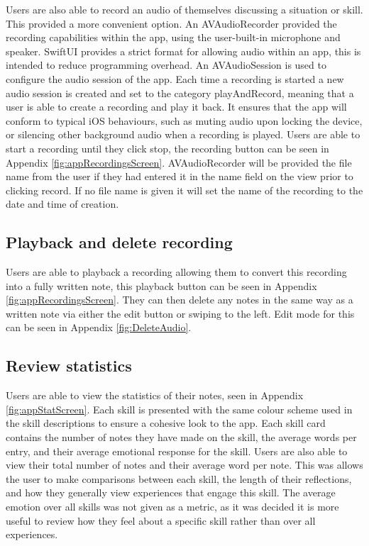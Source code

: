 \documentclass{l4proj}
\begin{document}
Users are also able to record an audio of themselves discussing a situation or skill. This provided a more convenient option. An AVAudioRecorder provided the recording capabilities within the app, using the user-built-in microphone and speaker. SwiftUI provides a strict format for allowing audio within an app, this is intended to reduce programming overhead. An AVAudioSession is used to configure the audio session of the app. Each time a recording is started a new audio session is created and set to the category playAndRecord, meaning that a user is able to create a recording and play it back. It ensures that the app will conform to typical iOS behaviours, such as muting audio upon locking the device, or silencing other background audio when a recording is played. 
Users are able to start a recording until they click stop, the recording button can be seen in Appendix \ref{fig:appRecordingsScreen}. AVAudioRecorder will be provided the file name from the user if they had entered it in the name field on the view prior to clicking record. If no file name is given it will set the name of the recording to the date and time of creation. 

\subsection{Playback and delete recording}

Users are able to playback a recording allowing them to convert this recording into a fully written note, this playback button can be seen in Appendix \ref{fig:appRecordingsScreen}. They can then delete any notes in the same way as a written note via either the edit button or swiping to the left. Edit mode for this can be seen in Appendix \ref{fig:DeleteAudio}.


\subsection{Review statistics}

Users are able to view the statistics of their notes, seen in Appendix \ref{fig:appStatScreen}. Each skill is presented with the same colour scheme used in the skill descriptions to ensure a cohesive look to the app. Each skill card contains the number of notes they have made on the skill, the average words per entry, and their average emotional response for the skill. Users are also able to view their total number of notes and their average word per note. This was allows the user to make comparisons between each skill, the length of their reflections, and how they generally view experiences that engage this skill. The average emotion over all skills was not given as a metric, as it was decided it is more useful to review how they feel about a specific skill rather than over all experiences. 
\end{document}
